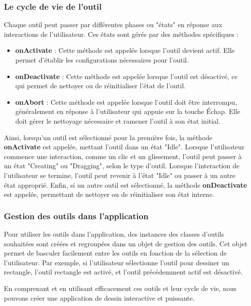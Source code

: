 \subsubsection{Le cycle de vie de l'outil}

Chaque outil peut passer par différentes phases ou "états" en réponse aux interactions de l'utilisateur. Ces états sont gérés par des méthodes spécifiques :

\begin{itemize}
    \item \textbf{onActivate} : Cette méthode est appelée lorsque l'outil devient actif. Elle permet d'établir les configurations nécessaires pour l'outil.
    \item \textbf{onDeactivate} : Cette méthode est appelée lorsque l'outil est désactivé, ce qui permet de nettoyer ou de réinitialiser l'état de l'outil.
    \item \textbf{onAbort} : Cette méthode est appelée lorsque l'outil doit être interrompu, généralement en réponse à l'utilisateur qui appuie sur la touche Échap. Elle doit gérer le nettoyage nécessaire et ramener l'outil à son état initial.
\end{itemize}

Ainsi, lorsqu'un outil est sélectionné pour la première fois, la méthode \textbf{onActivate} est appelée, mettant l'outil dans un état "Idle". Lorsque l'utilisateur commence une interaction, comme un clic et un glissement, l'outil peut passer à un état "Creating" ou "Dragging", selon le type d'outil. Lorsque l'interaction de l'utilisateur se termine, l'outil peut revenir à l'état "Idle" ou passer à un autre état approprié. Enfin, si un autre outil est sélectionné, la méthode \textbf{onDeactivate} est appelée, permettant de nettoyer ou de réinitialiser son état interne.

\subsubsection{Gestion des outils dans l'application}

Pour utiliser les outils dans l'application, des instances des classes d'outils souhaitées sont créées et regroupées dans un objet de gestion des outils. Cet objet permet de basculer facilement entre les outils en fonction de la sélection de l'utilisateur. Par exemple, si l'utilisateur sélectionne l'outil pour dessiner un rectangle, l'outil rectangle est activé, et l'outil précédemment actif est désactivé.

En comprenant et en utilisant efficacement ces outils et leur cycle de vie, nous pouvons créer une application de dessin interactive et puissante.

